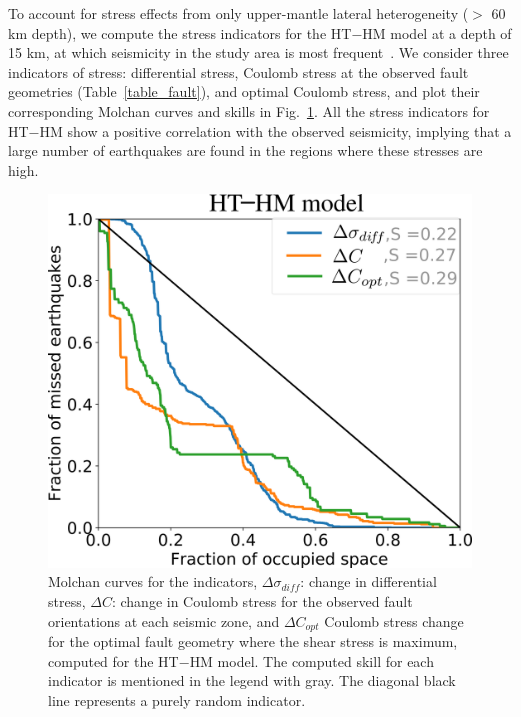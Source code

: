\documentclass[draft,linenumbers]{agujournal2018}
\begin{document}
To account for stress effects from only upper-mantle lateral heterogeneity ($>$ 60 km depth), we compute the stress indicators for the HT$-$HM model at a depth of 15 km, at which seismicity in the study area is most frequent~\citep[e.g.,][]{mazzotti2010state}. We consider three indicators of stress: differential stress, Coulomb stress at the observed fault geometries (Table~\ref{table_fault}), and optimal Coulomb stress, and plot their corresponding Molchan curves and skills in Fig.~\ref{ht_hm_skill}. All the stress indicators for HT$-$HM show a positive correlation with the observed seismicity, implying that a large number of earthquakes are found in the regions where these stresses are high. 
%
\begin{figure}
\centering
	\includegraphics[width=0.5\linewidth]{figures/ht_hm_updated.png}
	\caption{Molchan curves for the indicators, $\Delta \sigma_{diff}$: change in differential stress, $\Delta C$: change in Coulomb stress for the observed fault orientations at each seismic zone, and $\Delta C_{opt}$ Coulomb stress change for the optimal fault geometry where the shear stress is maximum, computed for the HT$-$HM  model. The computed skill for each indicator is mentioned in the legend with gray. The diagonal black line represents a purely random indicator. }
	\label{ht_hm_skill}
\end{figure}
\end{document}
